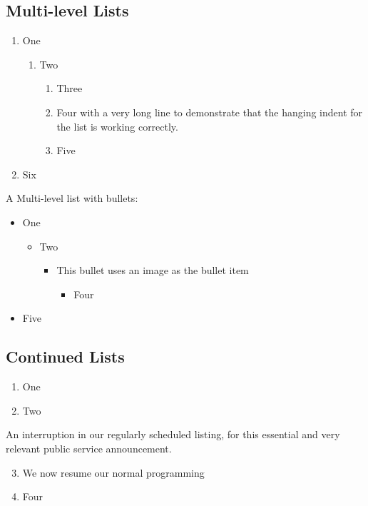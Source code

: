 \documentclass[\officeparserdriver 12pt]{article}
\begin{document}
\subsection[{Multi-level Lists}]{\protect\textcolor{hex4F81BD}{Multi-level Lists}}\label{_Toc1093260318}\label{multi-level-lists}

\begin{enumerate}
\item One
\begin{enumerate}
\item Two
\begin{enumerate}
\item Three
\item Four with a very long line to demonstrate that the hanging indent for the list is working correctly.
\item Five
\end{enumerate}
\end{enumerate}
\item Six
\end{enumerate}

{\leftskip=18bp A Multi-level list with bullets:\par}

\begin{itemize}
\item One
\begin{itemize}
\item Two
\begin{itemize}
\item This bullet uses an image as the bullet item
\begin{itemize}
\item Four
\end{itemize}
\end{itemize}
\end{itemize}
\item Five
\end{itemize}

\subsection[{Continued Lists}]{\protect\textcolor{hex4F81BD}{Continued Lists}}\label{_Toc1471533984}\label{continued-lists}

\begin{enumerate}
\item One
\item Two
\end{enumerate}

{\leftskip=36bp An interruption in our regularly scheduled listing, for this essential and very relevant public service announcement.\par}

\begin{enumerate}
\setcounter{enumi}{2}
\item We now resume our normal programming
\item Four
\end{enumerate}

\theendnotes
\end{document}
